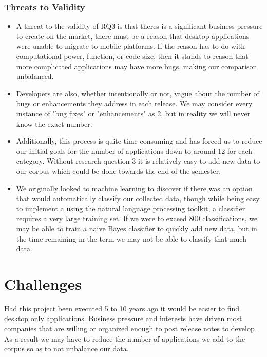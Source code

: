 \documentclass{acm_proc_article-sp}
\begin{document}
\subsubsection{Threats to Validity}
\begin{itemize}


\item A threat to the validity of RQ3 is that theres is a significant business pressure to create \sibs on the market, there must be a reason that desktop applications were unable to migrate to mobile platforms. 
If the reason has to do with computational power, function, or code size, then it stands to reason that more complicated applications may have more bugs, making our comparison unbalanced.

\item Developers are also, whether intentionally or not, vague about the number of bugs or enhancements they address in each release. 
We may consider every instance of "bug fixes" or "enhancements" as 2, but in reality we will never know the exact number.

\item Additionally, this process is quite time consuming and has forced us to reduce our initial goals for the number of applications down to around 12 for each category.
Without research question 3 it is relatively easy to add new data to our corpus which could be done towards the end of the semester.

\item We originally looked to machine learning to discover if there was an option that would automatically classify our collected data, though while being easy to implement a using the natural language processing toolkit, a classifier requires a very large training set.
If we were to exceed 800 classifications, we may be able to train a naive Bayes classifier to quickly add new data, but in the time remaining in the term we may not be able to classify that much data.

\end{itemize}












\section{Challenges}
Had this project been executed 5 to 10 years ago it would be easier to find desktop only applications. 
Business pressure and interests have driven most companies that are willing or organized enough to post release notes to develop \sibs. 
As a result we may have to reduce the number of applications we add to the corpus so as to not unbalance our data.
\end{document}
